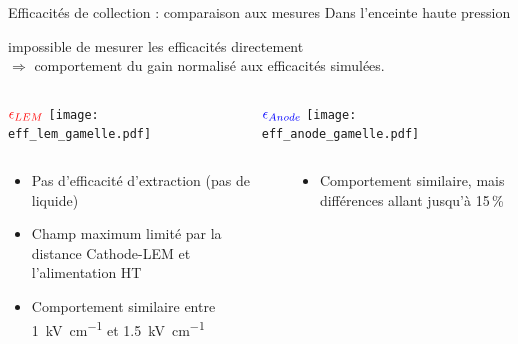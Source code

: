     \begin{frame}{Efficacités de collection : comparaison aux mesures}
        Dans l'enceinte haute pression
        \begin{scriptsize}
            impossible de mesurer les efficacités directement \\$\Rightarrow$ comportement du gain normalisé aux efficacités simulées.
        \begin{columns}
            \begin{column}{0.5\textwidth}
                \centering $\textcolor{red}{\epsilon_{LEM}}$
                \texttt{[image: eff\_lem\_gamelle.pdf]}
            \end{column}\hfill
            \begin{column}{0.5\textwidth}
                \centering $\textcolor{blue}{\epsilon_{Anode}}$
                \texttt{[image: eff\_anode\_gamelle.pdf]}
            \end{column}
        \end{columns}
   		\begin{columns}
            \begin{column}{0.5\textwidth}
                \begin{itemize}
                    \item Pas d'efficacité d'extraction (pas de liquide)
                    \item Champ maximum limité par la distance Cathode-LEM et l'alimentation HT
                    \item Comportement similaire entre \SI{1}{\kilo\volt\per\centi\meter} et \SI{1.5}{\kilo\volt\per\centi\meter}
                \end{itemize}
            \end{column}\hfill
            \begin{column}{0.5\textwidth}
                \begin{itemize}
                    \item Comportement similaire, mais différences allant jusqu'à 15\,\%
                \end{itemize}
            \end{column}
        \end{columns}
        \end{scriptsize}
    \end{frame}

